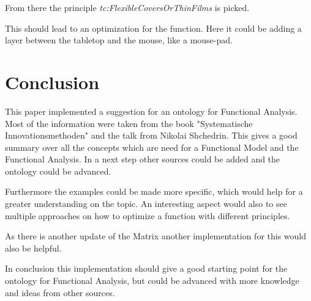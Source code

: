 \documentclass[11pt,a4paper]{article}
\begin{document}
From there the principle \emph{tc:FlexibleCoversOrThinFilms} is picked.

This should lead to an optimization for the function.  Here it could be adding
a layer between the tabletop and the mouse, like a mouse-pad.

\section{Conclusion}
\label{sec:conclusion}

This paper implemented a suggestion for an ontology for Functional Analysis.
Most of the information were taken from the book "Systematische
Innovationsmethoden" and the talk from Nikolai Shchedrin.  This gives a good
summary over all the concepts which are need for a Functional Model and the
Functional Analysis.  In a next step other sources could be added and the
ontology could be advanced.

Furthermore the examples could be made more specific, which would help for a
greater understanding on the topic.  An interesting aspect would also to see
multiple approaches on how to optimize a function with different principles.

As there is another update of the Matrix another implementation for this would
also be helpful.

In conclusion this implementation should give a good starting point for the
ontology for Functional Analysis, but could be advanced with more knowledge
and ideas from other sources.
\end{document}

